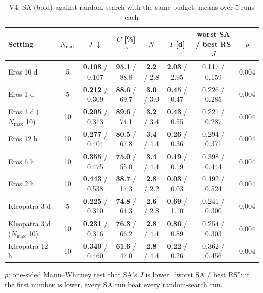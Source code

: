 \begin{table}[htbp]
\centering
\caption{V4: \ac{SA} (bold) against random search with the same budget; means over 5 runs each}
\label{tab:v4}
\scriptsize
\begin{tabular}{@{}lccccccc@{}}
\toprule
Setting & $N_{\max}$ & $J$ $\downarrow$ & $C$ [\%] $\uparrow$ & $N$ & $T$ [d] & worst SA / best RS $J$ & $p$ \\
\midrule
Eros 10 d & 5 & \textbf{0.108} / 0.167 & \textbf{95.1} / 88.8 & \textbf{2.2} / 2.8 & \textbf{2.03} / 2.95 & 0.117 / 0.159 & 0.004 \\
Eros 1 d & 5 & \textbf{0.212} / 0.309 & \textbf{88.6} / 69.7 & \textbf{3.0} / 3.0 & \textbf{0.45} / 0.47 & 0.226 / 0.285 & 0.004 \\
Eros 1 d ($N_{\max}$ 10) & 10 & \textbf{0.205} / 0.313 & \textbf{89.6} / 74.1 & \textbf{3.2} / 3.4 & \textbf{0.43} / 0.55 & 0.221 / 0.287 & 0.004 \\
Eros 12 h & 10 & \textbf{0.277} / 0.404 & \textbf{80.5} / 67.8 & \textbf{3.4} / 4.4 & \textbf{0.26} / 0.36 & 0.294 / 0.371 & 0.004 \\
Eros 6 h & 10 & \textbf{0.355} / 0.475 & \textbf{75.0} / 55.0 & \textbf{3.4} / 4.4 & \textbf{0.19} / 0.19 & 0.398 / 0.444 & 0.004 \\
Eros 2 h & 10 & \textbf{0.443} / 0.538 & \textbf{38.7} / 17.3 & \textbf{2.8} / 2.2 & \textbf{0.03} / 0.03 & 0.492 / 0.524 & 0.004 \\
Kleopatra 3 d & 5 & \textbf{0.225} / 0.310 & \textbf{74.8} / 64.3 & \textbf{2.6} / 2.8 & \textbf{0.69} / 1.10 & 0.241 / 0.300 & 0.004 \\
Kleopatra 3 d ($N_{\max}$ 10) & 10 & \textbf{0.231} / 0.316 & \textbf{76.3} / 66.2 & \textbf{2.8} / 4.4 & \textbf{0.86} / 0.89 & 0.254 / 0.303 & 0.004 \\
Kleopatra 12 h & 10 & \textbf{0.340} / 0.460 & \textbf{61.6} / 47.0 & \textbf{2.8} / 4.4 & \textbf{0.22} / 0.26 & 0.362 / 0.456 & 0.004 \\
\bottomrule
\end{tabular}
\par\smallskip
\parbox{0.95\textwidth}{\scriptsize $p$: one-sided Mann--Whitney test that \ac{SA}'s $J$ is lower. ``worst SA / best RS'': if the first number is lower, every \ac{SA} run beat every random-search run.}
\end{table}
